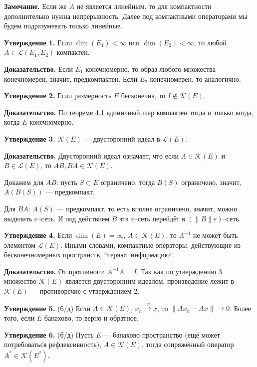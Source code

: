 \textbf{Замечание.} Если же $A$ не является линейным, то для компактности дополнительно нужна непрерывность.
Далее под компактными операторами мы будем подразумевать только линейные.

\textbf{Утверждение 1.} Если $\dim(E_1) < \infty$ или $\dim(E_2) < \infty$, то любой $A \in \mathcal L(E_1, E_2)$ компактен.

\textbf{Доказательство.} Если $E_1$ конечномерно, то образ любого множества конечномерен, значит, предкомпактен.
Если $E_2$ конечномерен, то аналогично.

\QED

\textbf{Утверждение 2.} Если размерность $E$ бесконечна, то $I \not\in \mathcal K(E)$.

\textbf{Доказательство.} По \hyperref[th:4-1]{теореме 4.1} единичный шар компактен тогда и только когда, когда $E$ конечномерно.

\QED

\textbf{Утверждение 3.} $\mathcal K(E)$ --- двусторонний идеал в $\mathcal L(E)$.

\textbf{Доказательство.} Двусторонний идеал означает, что если $A \in \mathcal K(E)$ и $B \in \mathcal L(E)$, то $AB, BA \in \mathcal K(E)$.

Докажем для $AB$: пусть $S \subset E$ ограничено, тогда $B(S)$ ограничено, значит, $A(B(S))$ --- предкомпакт.

Для $BA$: $A(S)$ --- предкомпакт, то есть вполне ограничено, значит, можно выделить $\varepsilon$--сеть.
И под действием $B$ эта $\varepsilon$--сеть перейдёт в $(\|B\| \varepsilon)$--сеть.

\QED

\textbf{Утверждение 4.} Если $\dim(E) = \infty$, $A \in \mathcal K(E)$, то $A^{-1}$ не может быть элементом $\mathcal L(E)$.
Иными словами, компактные операторы, действующие из бесконечномерных пространств, ``теряют информацию``.

\textbf{Доказательство.} От противного: $A^{-1} A = I$.
Так как по утверждению 3 множество $\mathcal K(E)$ является двусторонним идеалом, произведение лежит в $\mathcal K(E)$ --- противоречие с утверждением 2.

\QED

\textbf{Утверждение 5.} (б/д) Если $A \in \mathcal K(E)$, $x_n \xrightarrow{w} x$, то $\|Ax_n - Ax\| \to 0$.
Более того, если $E$ банахово, то верно и обратное.

\textbf{Утверждение 6.} (б/д) Пусть $E$ --- банахово пространство (ещё может потребоваться рефлексивность), $A \in \mathcal K(E)$, тогда сопряжённый оператор $A^* \in \mathcal K(E^*)$.

